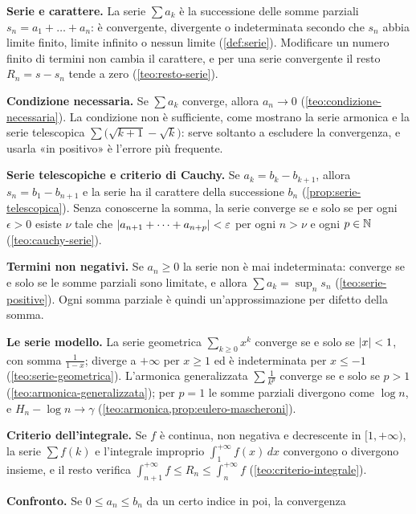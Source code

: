 \begin{puntichiave}
\item \textbf{Serie e carattere.} La serie $\sum a_{k}$ è la successione delle somme parziali
$s_{n}=a_{1}+\dots+a_{n}$: è convergente, divergente o indeterminata secondo che $s_{n}$ abbia
limite finito, limite infinito o nessun limite (\cref{def:serie}). Modificare un numero
finito di termini non cambia il carattere, e per una serie convergente il resto
$R_{n}=s-s_{n}$ tende a zero (\cref{teo:resto-serie}).
\item \textbf{Condizione necessaria.} Se $\sum a_{k}$ converge, allora $a_{n}\to0$
(\cref{teo:condizione-necessaria}). La condizione non è sufficiente, come mostrano la serie
armonica e la serie telescopica $\sum\bigl(\sqrt{k+1}-\sqrt k\bigr)$: serve soltanto a escludere la
convergenza, e usarla «in positivo» è l'errore più frequente.
\item \textbf{Serie telescopiche e criterio di Cauchy.} Se $a_{k}=b_{k}-b_{k+1}$, allora
$s_{n}=b_{1}-b_{n+1}$ e la serie ha il carattere della successione $b_{n}$
(\cref{prop:serie-telescopica}). Senza conoscerne la somma, la serie converge se e solo se
per ogni $\epsilon>0$ esiste $\nu$ tale che $\lvert a_{n+1}+\dots+a_{n+p}\rvert<\varepsilon$ per ogni $n>\nu$ e
ogni $p\in\mathbb{N}$ (\cref{teo:cauchy-serie}).
\item \textbf{Termini non negativi.} Se $a_{n}\ge0$ la serie non è mai indeterminata:
converge se e solo se le somme parziali sono limitate, e allora $\sum a_{k}=\sup_{n}s_{n}$
(\cref{teo:serie-positive}). Ogni somma parziale è quindi un'approssimazione per difetto
della somma.
\item \textbf{Le serie modello.} La serie geometrica $\sum_{k\ge0}x^{k}$ converge se e solo se
$\lvert x\rvert<1$, con somma $\frac1{1-x}$; diverge a $+\infty$ per $x\ge1$ ed è indeterminata per
$x\le-1$ (\cref{teo:serie-geometrica}). L'armonica generalizzata $\sum\frac1{k^{p}}$ converge
se e solo se $p>1$ (\cref{teo:armonica-generalizzata}); per $p=1$ le somme parziali
divergono come $\log n$, e $H_{n}-\log n\to\gamma$ (\cref{teo:armonica,prop:eulero-mascheroni}).
\item \textbf{Criterio dell'integrale.} Se $f$ è continua, non negativa e decrescente in
$[1,+\infty)$, la serie $\sum f(k)$ e l'integrale improprio $\int_{1}^{+\infty}f(x)\,dx$
convergono o divergono insieme, e il resto verifica
$\int_{n+1}^{+\infty}f\le R_{n}\le\int_{n}^{+\infty}f$ (\cref{teo:criterio-integrale}).
\item \textbf{Confronto.} Se $0\le a_{n}\le b_{n}$ da un certo indice in poi, la convergenza

\end{puntichiave}
